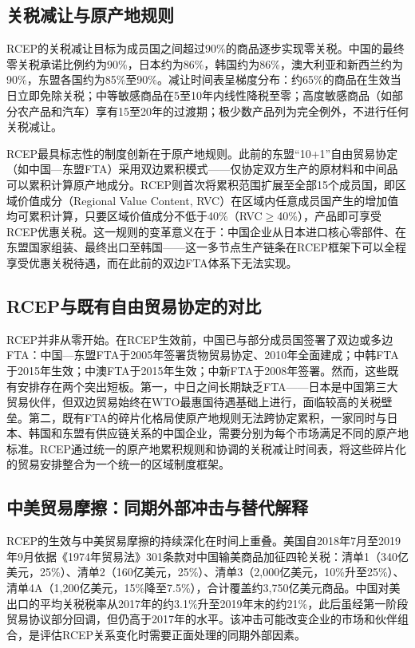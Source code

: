 \documentclass[12pt,a4paper]{ctexart}
\begin{document}
\subsection{关税减让与原产地规则}

RCEP的关税减让目标为成员国之间超过90\%的商品逐步实现零关税。中国的最终零关税承诺比例约为90\%，日本约为86\%，韩国约为86\%，澳大利亚和新西兰约为90\%，东盟各国约为85\%至90\%\citep{zhang2021rcep}。减让时间表呈梯度分布：约65\%的商品在生效当日立即免除关税；中等敏感商品在5至10年内线性降税至零；高度敏感商品（如部分农产品和汽车）享有15至20年的过渡期；极少数产品列为完全例外，不进行任何关税减让。

RCEP最具标志性的制度创新在于原产地规则。此前的东盟``10+1''自由贸易协定（如中国—东盟FTA）采用双边累积模式——仅协定双方生产的原材料和中间品可以累积计算原产地成分。RCEP则首次将累积范围扩展至全部15个成员国，即区域价值成分（Regional Value Content, RVC）在区域内任意成员国产生的增加值均可累积计算，只要区域价值成分不低于40\%（RVC$\geq$40\%），产品即可享受RCEP优惠关税。这一规则的变革意义在于：中国企业从日本进口核心零部件、在东盟国家组装、最终出口至韩国——这一多节点生产链条在RCEP框架下可以全程享受优惠关税待遇，而在此前的双边FTA体系下无法实现。

\subsection{RCEP与既有自由贸易协定的对比}

RCEP并非从零开始。在RCEP生效前，中国已与部分成员国签署了双边或多边FTA：中国—东盟FTA于2005年签署货物贸易协定、2010年全面建成\citep{shen2011china}；中韩FTA于2015年生效；中澳FTA于2015年生效；中新FTA于2008年签署。然而，这些既有安排存在两个突出短板。第一，中日之间长期缺乏FTA——日本是中国第三大贸易伙伴，但双边贸易始终在WTO最惠国待遇基础上进行，面临较高的关税壁垒。第二，既有FTA的碎片化格局使原产地规则无法跨协定累积，一家同时与日本、韩国和东盟有供应链关系的中国企业，需要分别为每个市场满足不同的原产地标准。RCEP通过统一的原产地累积规则和协调的关税减让时间表，将这些碎片化的贸易安排整合为一个统一的区域制度框架。

\subsection{中美贸易摩擦：同期外部冲击与替代解释}

RCEP的生效与中美贸易摩擦的持续深化在时间上重叠。美国自2018年7月至2019年9月依据《1974年贸易法》301条款对中国输美商品加征四轮关税：清单1（340亿美元，25\%）、清单2（160亿美元，25\%）、清单3（2,000亿美元，10\%升至25\%）、清单4A（1,200亿美元，15\%降至7.5\%），合计覆盖约3,750亿美元商品\citep{bown2022us}。中国对美出口的平均关税税率从2017年的约3.1\%升至2019年末的约21\%，此后虽经第一阶段贸易协议部分回调，但仍高于2017年的水平。该冲击可能改变企业的市场和伙伴组合，是评估RCEP关系变化时需要正面处理的同期外部因素。
\end{document}
